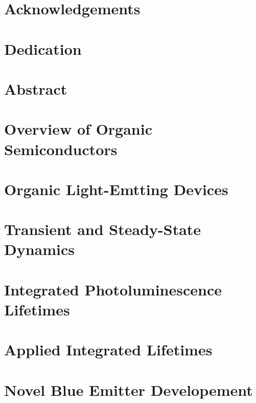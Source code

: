 \documentclass{article}
\begin{document}

\newpage

\section*{Acknowledgements}

\newpage

\section*{Dedication}

\newpage

\section*{Abstract}

\newpage


\newpage

\section{Overview of Organic Semiconductors}

\newpage

\section{Organic Light-Emtting Devices}

\newpage

\section{Transient and Steady-State Dynamics}

\newpage

\section{Integrated Photoluminescence Lifetimes}

\newpage

\section{Applied Integrated Lifetimes}

\newpage

\section{Novel Blue Emitter Developement}

\newpage
\end{document}
